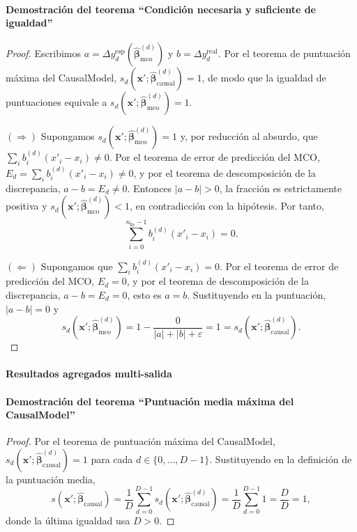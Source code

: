\documentclass[12pt]{report} %
\begin{document}
\paragraph*{Demostración del teorema ``Condición necesaria y suficiente de igualdad''}
\begin{proof}
    Escribimos $a = \Delta y_d^{\text{esp}}\!\left(\widehat{\boldsymbol{\beta}}^{(d)}_{\text{mco}}\right)$ y $b = \Delta y_d^{\text{real}}$. Por el teorema de puntuación máxima del CausalModel, $s_d\!\left(\mathbf{x}'; \widehat{\boldsymbol{\beta}}^{(d)}_{\text{causal}}\right) = 1$, de modo que la igualdad de puntuaciones equivale a $s_d\!\left(\mathbf{x}'; \widehat{\boldsymbol{\beta}}^{(d)}_{\text{mco}}\right) = 1$.

    \noindent$(\Rightarrow)$ Supongamos $s_d\!\left(\mathbf{x}'; \widehat{\boldsymbol{\beta}}^{(d)}_{\text{mco}}\right) = 1$ y, por reducción al absurdo, que $\sum_{i} b_i^{(d)} (x'_i - x_i) \neq 0$. Por el teorema de error de predicción del MCO, $E_d = \sum_{i} b_i^{(d)} (x'_i - x_i) \neq 0$, y por el teorema de descomposición de la discrepancia, $a - b = E_d \neq 0$. Entonces $|a - b| > 0$, la fracción es estrictamente positiva y $s_d\!\left(\mathbf{x}'; \widehat{\boldsymbol{\beta}}^{(d)}_{\text{mco}}\right) < 1$, en contradicción con la hipótesis. Por tanto,
    $$\sum_{i=0}^{n_{\text{In}}-1} b_i^{(d)} (x'_i - x_i) = 0.$$

    \noindent$(\Leftarrow)$ Supongamos que $\sum_{i} b_i^{(d)} (x'_i - x_i) = 0$. Por el teorema de error de predicción del MCO, $E_d = 0$, y por el teorema de descomposición de la discrepancia, $a - b = E_d = 0$, esto es $a = b$. Sustituyendo en la puntuación, $|a - b| = 0$ y
    $$s_d\!\left(\mathbf{x}'; \widehat{\boldsymbol{\beta}}^{(d)}_{\text{mco}}\right) = 1 - \frac{0}{|a| + |b| + \varepsilon} = 1 = s_d\!\left(\mathbf{x}'; \widehat{\boldsymbol{\beta}}^{(d)}_{\text{causal}}\right).$$
\end{proof}

\paragraph*{Resultados agregados multi-salida}

\paragraph*{Demostración del teorema ``Puntuación media máxima del CausalModel''}
\begin{proof}
    Por el teorema de puntuación máxima del CausalModel, $s_d\!\left(\mathbf{x}'; \widehat{\boldsymbol{\beta}}^{(d)}_{\text{causal}}\right) = 1$ para cada $d \in \{0, \ldots, D-1\}$. Sustituyendo en la definición de la puntuación media,
    $$s\!\left(\mathbf{x}'; \widehat{\boldsymbol{\beta}}_{\text{causal}}\right) = \frac{1}{D}\sum_{d=0}^{D-1} s_d\!\left(\mathbf{x}'; \widehat{\boldsymbol{\beta}}^{(d)}_{\text{causal}}\right) = \frac{1}{D}\sum_{d=0}^{D-1} 1 = \frac{D}{D} = 1,$$
    donde la última igualdad usa $D > 0$.
\end{proof}
\end{document}
